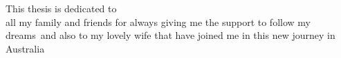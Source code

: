 \begin{dedication}
This thesis is dedicated to\\
 all my family and friends for always giving me the support to follow my dreams\
and also to my lovely wife that have joined me in this new journey in Australia\\
\end{dedication}